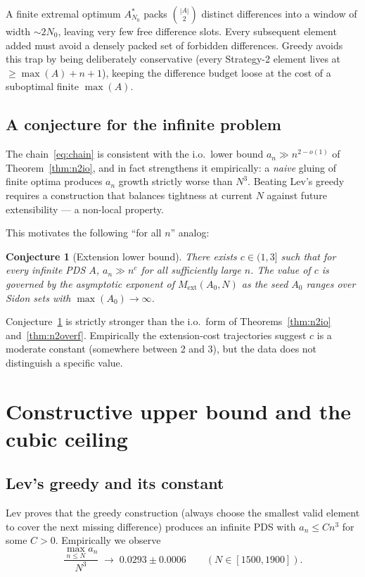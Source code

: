 \documentclass[11pt]{article}
\newtheorem{conjecture}{Conjecture}
\begin{document}
A finite extremal optimum $A_{N_0}^*$ packs $\binom{|A|}{2}$
distinct differences into a window of width $\sim 2 N_0$, leaving very
few free difference slots. Every subsequent element added must avoid a
densely packed set of forbidden differences. Greedy avoids this trap by
being deliberately conservative (every Strategy-2 element lives at
$\geq \max(A) + n + 1$), keeping the difference budget loose at the
cost of a suboptimal finite $\max(A)$.

\subsection{A conjecture for the infinite problem}

The chain~\eqref{eq:chain} is consistent with the i.o.\ lower bound
$a_n \gg n^{2-o(1)}$ of Theorem~\ref{thm:n2io}, and in fact strengthens
it empirically: a \emph{naive} gluing of finite optima produces $a_n$
growth strictly worse than $N^3$. Beating Lev's greedy requires a
construction that balances tightness at current $N$ against future
extensibility --- a non-local property.

This motivates the following ``for all $n$'' analog:

\begin{conjecture}[Extension lower bound]\label{conj:ext}
There exists $c \in (1, 3]$ such that for every infinite PDS $A$,
$a_n \gg n^c$ for all sufficiently large $n$. The value of $c$ is
governed by the asymptotic exponent of $M_{\text{ext}}(A_0, N)$ as the
seed $A_0$ ranges over Sidon sets with $\max(A_0) \to \infty$.
\end{conjecture}

Conjecture~\ref{conj:ext} is strictly stronger than the i.o.\ form of
Theorems~\ref{thm:n2io} and~\ref{thm:n2overf}. Empirically the
extension-cost trajectories suggest $c$ is a moderate constant
(somewhere between 2 and 3), but the data does not distinguish a
specific value.

\section{Constructive upper bound and the cubic ceiling}\label{sec:ub}

\subsection{Lev's greedy and its constant}

Lev \cite{Le04} proves that the greedy construction (always choose the
smallest valid element to cover the next missing difference) produces an
infinite PDS with $a_n \leq C n^3$ for some $C > 0$. Empirically
\cite{this} we observe
\[
   \frac{\max_{n \leq N} a_n}{N^3} \;\to\; 0.0293 \pm 0.0006
   \qquad (N \in [1500, 1900]).
\]
\end{document}
